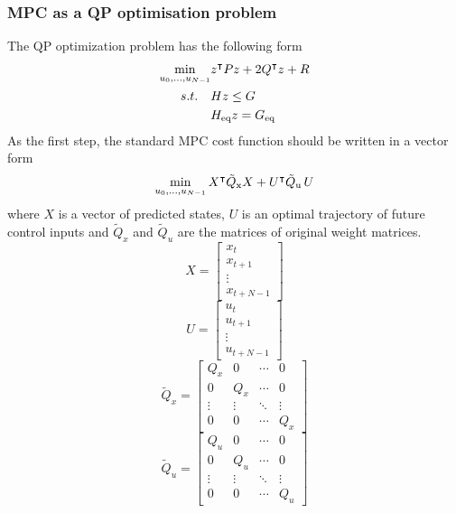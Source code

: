 \subsubsection{MPC as a QP optimisation problem}
The QP optimization problem has the following form
\begin{subequations}
	\begin{align}
	\min_{u_0,...,u_{N-1}} & z^\intercal Pz + 2Q^\intercal z + R\\
	\label{cst_qp}s.t.\quad&Hz\leq G\\
	&H _{\text{eq}}z = G _{\text{eq}}
	\end{align}
\end{subequations}
As the first step, the standard MPC cost function should be written in a vector form
\begin{equation}
	\min_{u_0,...,u_{N-1}} X^\intercal\tilde{Q} _{\text{x}}X + U^\intercal\tilde{Q} _{\text{u}}\,U\\
\end{equation}
where $X$ is a vector of predicted states, $U$ is an optimal trajectory of future control inputs and $\tilde{Q}_x$ and $\tilde{Q}_u$ are the matrices of original weight matrices.
\begin{equation}
	X = \begin{bmatrix}
	x_t\\x_{t+1}\\\vdots\\x_{t+N-1}
	\end{bmatrix}
\end{equation}
\begin{equation}
U = \begin{bmatrix}
u_t\\u_{t+1}\\\vdots\\u_{t+N-1}
\end{bmatrix}
\end{equation}
\begin{equation}
\tilde{Q}_x = \begin{bmatrix}
Q_x&0&\cdots&0\\
0&Q_x&\cdots&0\\
\vdots&\vdots&\ddots&\vdots\\
0&0&\cdots&Q_x
\end{bmatrix}
\end{equation}
\begin{equation}
\tilde{Q}_u = \begin{bmatrix}
Q_u&0&\cdots&0\\
0&Q_u&\cdots&0\\
\vdots&\vdots&\ddots&\vdots\\
0&0&\cdots&Q_u
\end{bmatrix}
\end{equation}

